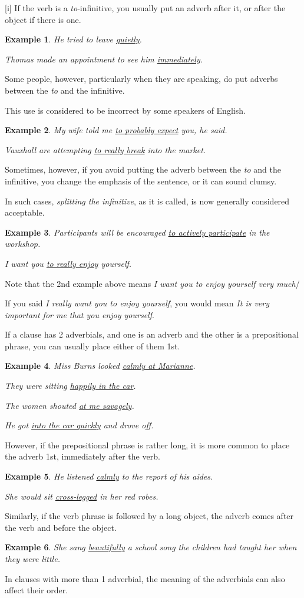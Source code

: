 \documentclass[oneside]{book}
\numberwithin{equation}{section}
\newtheorem{example}{Example}[section]
\begin{document}
%
\noindent{} [i] If the verb is a \textit{to}-infinitive, you usually put an adverb after it, or after the object if there is one.
\begin{example}
    He tried to leave \underline{quietly}.
    
    Thomas made an appointment to see him \underline{immediately}.
\end{example}
Some people, however, particularly when they are speaking, do put adverbs between the \textit{to} and the infinitive.

This use is considered to be incorrect by some speakers of English.
\begin{example}
    My wife told me \underline{to probably expect} you, he said.
    
    Vauxhall are attempting \underline{to really break} into the market.
\end{example}
Sometimes, however, if you avoid putting the adverb between the \textit{to} and the infinitive, you change the emphasis of the sentence, or it can sound clumsy.

In such cases, \textit{splitting the infinitive}, as it is called, is now generally considered acceptable.
\begin{example}
    Participants will be encouraged \underline{to actively participate} in the workshop.
    
    I want you \underline{to really enjoy} yourself.
\end{example}
Note that the 2nd example above means \textit{I want you to enjoy yourself very much}/

If you said \textit{I really want you to enjoy yourself}, you would mean \textit{It is very important for me that you enjoy yourself}.

%
\noindent{} If a clause has 2 adverbials, and one is an adverb and the other is a prepositional phrase, you can usually place either of them 1st.
\begin{example}
    Miss Burns looked \underline{calmly at Marianne}.
    
    They were sitting \underline{happily in the car}.
    
    The women shouted \underline{at me savagely}.
    
    He got \underline{into the car quickly} and drove off.
\end{example}
However, if the prepositional phrase is rather long, it is more common to place the adverb 1st, immediately after the verb.
\begin{example}
    He listened \underline{calmly} to the report of his aides.
    
    She would sit \underline{cross-legged} in her red robes.
\end{example}
Similarly, if the verb phrase is followed by a long object, the adverb comes after the verb and before the object.
\begin{example}
    She sang \underline{beautifully} a school song the children had taught her when they were little.
\end{example}
%
\noindent{} In clauses with more than 1 adverbial, the meaning of the adverbials can also affect their order.
\end{document}
